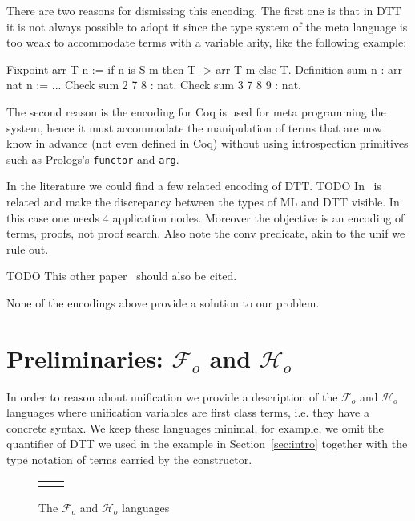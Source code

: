 \documentclass[sigconf,natbib=false,review]{acmart}
\newcommand{\Fo}{\ensuremath{\mathcal{F}_{\!o}\xspace}} %
\newcommand{\Ho}{\ensuremath{\mathcal{H}_o}\xspace}
\begin{document}
\noindent
There are two reasons for dismissing this encoding. The first one is that
in DTT it is not always possible to adopt it since the type system
of the meta language is too weak to accommodate terms with a variable arity,
like the following example:

\begin{coqcode}
Fixpoint arr T n := if n is S m then T -> arr T m else T.
Definition sum n : arr nat n := ...
Check sum 2   7 8   : nat.
Check sum 3   7 8 9 : nat.
\end{coqcode}

\noindent
The second reason is the encoding for Coq is used for meta programming the
system, hence it must accommodate the manipulation of terms that are now
know in advance (not even defined in Coq) without using introspection
primitives such as Prologs's \texttt{functor} and \texttt{arg}.

In the literature we could find a few related encoding of DTT.
TODO In~\cite{felty93lics} is related and make the
discrepancy between the types of ML and DTT visible. In this case
one needs 4 application nodes. Moreover the objective is an encoding
of terms, proofs, not proof search. Also note the conv predicate,
akin to the unif we rule out.

TODO This other paper~\cite{10.1007/978-3-031-38499-8_25} should also be cited.

None of the encodings above provide a solution to our problem.

\section{Preliminaries: \Fo{} and \Ho}
\label{sec:lang-spec}

In order to reason about unification we provide a description of the
\Fo{} and \Ho languages where unification variables
are first class terms, i.e. they have a concrete syntax. We keep these languages
minimal, for example, we omit the  quantifier of DTT we used
in the example in Section~\ref{sec:intro} together with the type notation of
terms carried by the  constructor.
%
\setlength{\abovecaptionskip}{0pt}
\setlength{\belowcaptionskip}{-13pt}

\begin{figure}[H]
  \begin{tabular}{ll}
  \begin{minipage}{0.21\textwidth}
   {code/fo_tm}
  \end{minipage}
  &
  \begin{minipage}{0.24\textwidth}
   {code/ho_tm}
  \end{minipage}
  \end{tabular}\vspace{4pt}
  \caption{The \Fo{} and \Ho languages}\vspace{0.3em}
  \label{code:common-terms}
\end{figure}
\end{document}
